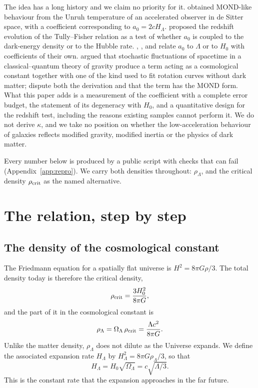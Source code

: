 \documentclass[fleqn,usenatbib]{mnras}
\begin{document}
The idea has a long history and we claim no priority for it. \citet{Milgrom1999} obtained MOND-like behaviour from the Unruh temperature of an accelerated observer in de Sitter space, with a coefficient corresponding to $a_0=2cH_\Lambda$. \citet{Limbach2008} proposed the redshift evolution of the Tully--Fisher relation as a test of whether $a_0$ is coupled to the dark-energy density or to the Hubble rate. \citet{BlanchetLeTiec2009}, \citet{KlinkhamerKopp2011}, \citet{Verlinde2017} and \citet{Milgrom2020} relate $a_0$ to $\Lambda$ or to $H_0$ with coefficients of their own. \citet{OppenheimRusso2024} argued that stochastic fluctuations of spacetime in a classical--quantum theory of gravity produce a term acting as a cosmological constant together with one of the kind used to fit rotation curves without dark matter; \citet{HertzbergLoeb2024} dispute both the derivation and that the term has the MOND form. What this paper adds is a measurement of the coefficient with a complete error budget, the statement of its degeneracy with $H_0$, and a quantitative design for the redshift test, including the reasons existing samples cannot perform it. We do not derive $\kappa$, and we take no position on whether the low-acceleration behaviour of galaxies reflects modified gravity, modified inertia or the physics of dark matter.

Every number below is produced by a public script with checks that can fail (Appendix~\ref{app:repro}). We carry both densities throughout: $\rho_\Lambda$, and the critical density $\rho_{\rm crit}$ as the named alternative.

\section{The relation, step by step}
\label{sec:relation}
\subsection{The density of the cosmological constant}
The Friedmann equation for a spatially flat universe is $H^2=8\pi G\rho/3$. The total density today is therefore the critical density,
\begin{equation}
\rho_{\rm crit}=\frac{3H_0^2}{8\pi G},
\label{eq:rhocrit}
\end{equation}
and the part of it in the cosmological constant is
\begin{equation}
\rho_\Lambda=\Omega_\Lambda\,\rho_{\rm crit}=\frac{\Lambda c^2}{8\pi G}.
\label{eq:rholambda}
\end{equation}
Unlike the matter density, $\rho_\Lambda$ does not dilute as the Universe expands. We define the associated expansion rate $H_\Lambda$ by $H_\Lambda^2=8\pi G\rho_\Lambda/3$, so that
\begin{equation}
H_\Lambda=H_0\sqrt{\Omega_\Lambda}=c\sqrt{\Lambda/3}.
\label{eq:hlambda}
\end{equation}
This is the constant rate that the expansion approaches in the far future.
\end{document}
